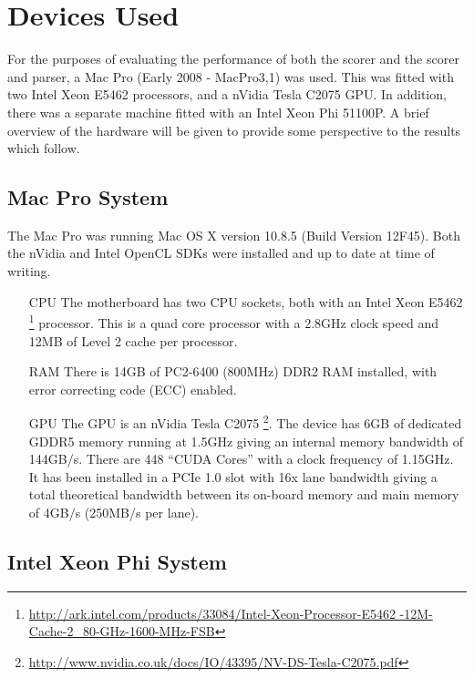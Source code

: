 \section{Devices Used}

For the purposes of evaluating the performance of both the scorer and the scorer
and parser, a Mac Pro (Early 2008 - MacPro3,1) was used. This was fitted with
two Intel Xeon E5462 processors, and a nVidia Tesla C2075 GPU. In addition,
there was a separate machine fitted with an Intel Xeon Phi 51100P. A brief
overview of the hardware will be given to provide some perspective to the
results which follow.

\subsection{Mac Pro System}

The Mac Pro was running Mac OS X version 10.8.5 (Build Version 12F45). Both the
nVidia and Intel OpenCL SDKs were installed and up to date at time of writing.

\begin{itemize}

\item[CPU] The motherboard has two CPU sockets, both with an Intel Xeon E5462
\footnote{\url{http://ark.intel.com/products/33084/Intel-Xeon-Processor-E5462
-12M-Cache-2_80-GHz-1600-MHz-FSB}} processor. This is a quad core processor with
a 2.8GHz clock speed and 12MB of Level 2 cache per processor.

\item[RAM] There is 14GB of PC2-6400 (800MHz) DDR2 RAM installed, with error
correcting code (ECC) enabled.

\item[GPU] The GPU is an nVidia Tesla C2075
\footnote{\url{http://www.nvidia.co.uk/docs/IO/43395/NV-DS-Tesla-C2075.pdf}}.
The device has 6GB of dedicated GDDR5 memory running at 1.5GHz giving an
internal memory bandwidth of 144GB/s. There are 448 ``CUDA Cores'' with a clock
frequency of 1.15GHz. It has been installed in a PCIe 1.0 slot with 16x lane
bandwidth giving a total theoretical bandwidth between its on-board memory and
main memory of 4GB/s (250MB/s per lane).

\end{itemize}

\subsection{Intel Xeon Phi System}

